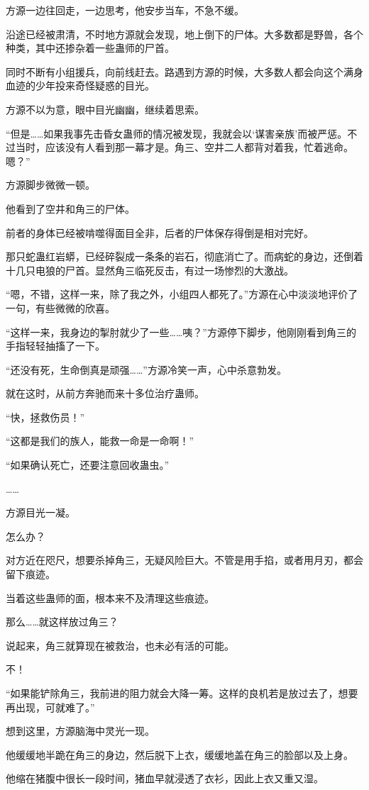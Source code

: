 \begin{this_body}
方源一边往回走，一边思考，他安步当车，不急不缓。

沿途已经被肃清，不时地方源就会发现，地上倒下的尸体。大多数都是野兽，各个种类，其中还掺杂着一些蛊师的尸首。

同时不断有小组援兵，向前线赶去。路遇到方源的时候，大多数人都会向这个满身血迹的少年投来奇怪疑惑的目光。

方源不以为意，眼中目光幽幽，继续着思索。

“但是……如果我事先击昏女蛊师的情况被发现，我就会以‘谋害亲族’而被严惩。不过当时，应该没有人看到那一幕才是。角三、空井二人都背对着我，忙着逃命。嗯？”

方源脚步微微一顿。

他看到了空井和角三的尸体。

前者的身体已经被啃噬得面目全非，后者的尸体保存得倒是相对完好。

那只蛇蛊红岩蟒，已经碎裂成一条条的岩石，彻底消亡了。而病蛇的身边，还倒着十几只电狼的尸首。显然角三临死反击，有过一场惨烈的大激战。

“嗯，不错，这样一来，除了我之外，小组四人都死了。”方源在心中淡淡地评价了一句，有些微微的欣喜。

“这样一来，我身边的掣肘就少了一些……咦？”方源停下脚步，他刚刚看到角三的手指轻轻抽搐了一下。

“还没有死，生命倒真是顽强……”方源冷笑一声，心中杀意勃发。

就在这时，从前方奔驰而来十多位治疗蛊师。

“快，拯救伤员！”

“这都是我们的族人，能救一命是一命啊！”

“如果确认死亡，还要注意回收蛊虫。”

……

方源目光一凝。

怎么办？

对方近在咫尺，想要杀掉角三，无疑风险巨大。不管是用手掐，或者用月刃，都会留下痕迹。

当着这些蛊师的面，根本来不及清理这些痕迹。

那么……就这样放过角三？

说起来，角三就算现在被救治，也未必有活的可能。

不！

“如果能铲除角三，我前进的阻力就会大降一筹。这样的良机若是放过去了，想要再出现，可就难了。”

想到这里，方源脑海中灵光一现。

他缓缓地半跪在角三的身边，然后脱下上衣，缓缓地盖在角三的脸部以及上身。

他缩在猪腹中很长一段时间，猪血早就浸透了衣衫，因此上衣又重又湿。


\end{this_body}
